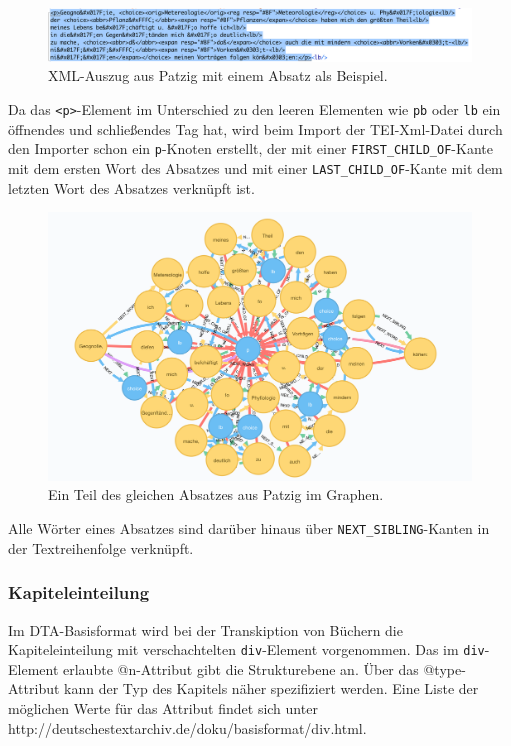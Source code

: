 \begin{figure}
\centering
\includegraphics{Bilder/TEI2Graph/p-xml-Beispiel.png}
\caption{XML-Auszug aus Patzig mit einem Absatz als Beispiel.}
\end{figure}

Da das \texttt{\textless{}p\textgreater{}}-Element im Unterschied zu den
leeren Elementen wie \texttt{pb} oder \texttt{lb} ein öffnendes und
schließendes Tag hat, wird beim Import der TEI-Xml-Datei durch den
Importer schon ein \texttt{p}-Knoten erstellt, der mit einer
\texttt{FIRST\_CHILD\_OF}-Kante mit dem ersten Wort des Absatzes und mit
einer \texttt{LAST\_CHILD\_OF}-Kante mit dem letzten Wort des Absatzes
verknüpft ist.

\begin{figure}
\centering
\includegraphics{Bilder/TEI2Graph/p-graph-Beispiel.png}
\caption{Ein Teil des gleichen Absatzes aus Patzig im Graphen.}
\end{figure}

Alle Wörter eines Absatzes sind darüber hinaus über
\texttt{NEXT\_SIBLING}-Kanten in der Textreihenfolge verknüpft.

\hypertarget{kapiteleinteilung}{%
\subsubsection{Kapiteleinteilung}\label{kapiteleinteilung}}

Im DTA-Basisformat wird bei der Transkiption von Büchern die
Kapiteleinteilung mit verschachtelten \texttt{div}-Element vorgenommen.
Das im \texttt{div}-Element erlaubte @n-Attribut gibt die Strukturebene
an. Über das @type-Attribut kann der Typ des Kapitels näher spezifiziert
werden. Eine Liste der möglichen Werte für das Attribut findet sich
unter http://deutschestextarchiv.de/doku/basisformat/div.html.

